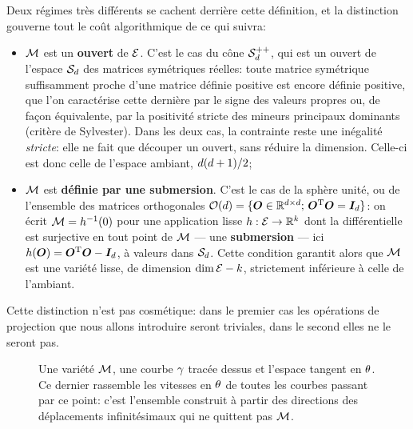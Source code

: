 Deux régimes très différents se cachent derrière cette définition, et la distinction gouverne tout le coût algorithmique de ce qui suivra:
\begin{itemize}
  \item $\mathcal{M}$ est un \textbf{ouvert} de $\mathcal{E}$. C'est le cas du cône $\mathcal{S}_{d}^{++}$, qui est un ouvert de l'espace $\mathcal{S}_{d}$ des matrices symétriques réelles: toute matrice symétrique suffisamment proche d'une matrice définie positive est encore définie positive, que l'on caractérise cette dernière par le signe des valeurs propres ou, de façon équivalente, par la positivité stricte des mineurs principaux dominants (critère de Sylvester). Dans les deux cas, la contrainte reste une inégalité \emph{stricte}: elle ne fait que découper un ouvert, sans réduire la dimension. Celle-ci est donc celle de l'espace ambiant, $d(d+1)/2$;
  \item $\mathcal{M}$ est \textbf{définie par une submersion}. C'est le cas de la sphère unité, ou de l'ensemble des matrices orthogonales $\mathcal{O}(d)=\{\boldsymbol{O}\in\mathbb{R}^{d\times d};\,\boldsymbol{O}^{\mathrm{T}}\boldsymbol{O}=\boldsymbol{I}_{d}\}$: on écrit $\mathcal{M}=h^{-1}(0)$ pour une application lisse $h:\mathcal{E}\to\mathbb{R}^k$ dont la différentielle est surjective en tout point de $\mathcal{M}$ --- une \textbf{submersion} --- ici $h(\boldsymbol{O})=\boldsymbol{O}^{\mathrm{T}}\boldsymbol{O}-\boldsymbol{I}_{d}$, à valeurs dans $\mathcal{S}_{d}$. Cette condition garantit alors que $\mathcal{M}$ est une variété lisse, de dimension $\dim\mathcal{E}-k$, strictement inférieure à celle de l'ambiant.
\end{itemize}

Cette distinction n'est pas cosmétique: dans le premier cas les opérations de projection que nous allons introduire seront triviales, dans le second elles ne le seront pas. \\

\begin{figure}[htb]
  \centering
  
  \caption{Une variété $\mathcal{M}$, une courbe $\gamma$ tracée dessus et
    l'espace tangent en $\theta$. Ce dernier rassemble les vitesses en $\theta$
    de toutes les courbes passant par ce point: c'est l'ensemble construit à partir des directions des
    déplacements infinitésimaux qui ne quittent pas $\mathcal{M}$.}
  \label{fig:context-riemann-tangent}
\end{figure}


